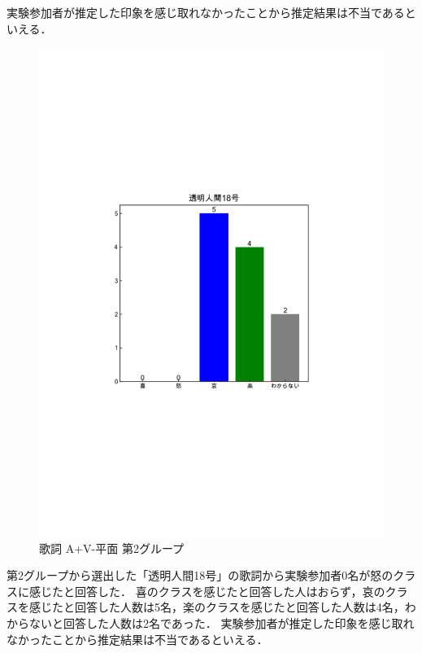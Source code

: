 実験参加者が推定した印象を感じ取れなかったことから推定結果は不当であるといえる．
\newpage
\begin{figure}[H]
    \centering
    \includegraphics[width=14cm]{4317.pdf}
    \vspace{-1mm}
    \caption{歌詞 A+V-平面 第2グループ}
    \label{fig:mms}
    \vspace{5mm}
\end{figure}
第2グループから選出した「透明人間18号」の歌詞から実験参加者0名が怒のクラスに感じたと回答した．
喜のクラスを感じたと回答した人はおらず，哀のクラスを感じたと回答した人数は5名，楽のクラスを感じたと回答した人数は4名，わからないと回答した人数は2名であった．
実験参加者が推定した印象を感じ取れなかったことから推定結果は不当であるといえる．
\newpage
